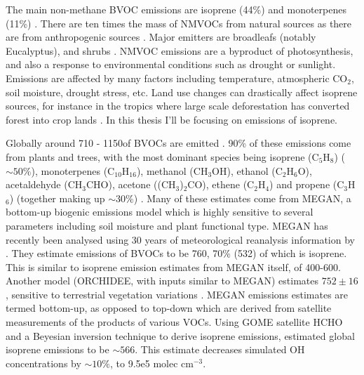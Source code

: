     The main non-methane BVOC emissions are isoprene (44\%) and monoterpenes (11\%) \parencite{Guenther2000, Kefauver2014}. 
    There are ten times the mass of NMVOCs from natural sources as there are from anthropogenic sources \parencite{Guenther2006, Kanakidou2005, Millet2006}.
    Major emitters are broadleafs (notably Eucalyptus), and shrubs \parencite{Guenther2006, Arneth2008, Niinemets2010, Monks2015}.
    NMVOC emissions are a byproduct of photosynthesis, and also a response to environmental conditions such as drought or sunlight.
    Emissions are affected by many factors including temperature, atmospheric CO$_2$, soil moisture, drought stress, etc.
    Land use changes can drastically affect isoprene sources, for instance in the tropics where large scale deforestation has converted forest into crop lands \parencite{Kanakidou2005}.
    In this thesis I'll be focusing on emissions of isoprene.
    
    Globally around 710 - 1150\tgcpyr of BVOCs are emitted \parencite{Guenther1995,Lathiere2006,Guenther2012, Lathiere2016}.
    90\% of these emissions come from plants and trees, with the most dominant species being isoprene (C$_5$H$_8$) ($\sim50\%$), monoterpenes (C$_10$H$_16$), methanol (CH$_3$OH), ethanol (C$_2$H$_6$O), acetaldehyde (CH$_3$CHO), acetone ((CH$_3$)$_2$CO), ethene (C$_2$H$_4$) and propene (C$_3$H$_6$) (together making up $\sim30\%$) \parencite{Guenther2012}.
    Many of these estimates come from MEGAN, a bottom-up biogenic emissions model which is highly sensitive to several parameters including soil moisture and plant functional type.
    MEGAN has recently been analysed using 30 years of meteorological reanalysis information by \textcite{Sindelarova2014}.
    They estimate emissions of BVOCs to be 760\tgcpyr, 70\% (532\tgcpyr) of which is isoprene.
    This is similar to isoprene emission estimates from MEGAN itself, of 400-600\tgcpyr \parencite{Guenther2006}.
    Another model (ORCHIDEE, with inputs similar to MEGAN) estimates $752\pm16$\tgcpyr, sensitive to terrestrial vegetation variations \parencite{Lathiere2006}.
    MEGAN emissions estimates are termed bottom-up, as opposed to top-down which are derived from satellite measurements of the products of various VOCs.
    Using GOME satellite HCHO and a Beyesian inversion technique to derive isoprene emissions, \textcite{Shim2005} estimated global isoprene emissions to be $\sim566$\tgcpyr. 
    This estimate decreases simulated OH concentrations by $\sim10\%$, to 9.5e5 molec cm$^{-3}$.
    
